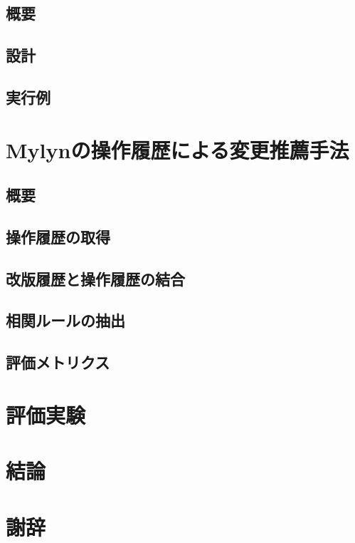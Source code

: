 \documentclass[a4paper]{jsbook}
\begin{document}
\section{概要}
\section{設計}
\section{実行例}
\chapter{Mylynの操作履歴による変更推薦手法}\label{experiment_chap}
\section{概要}
\section{操作履歴の取得}
\section{改版履歴と操作履歴の結合}
\section{相関ルールの抽出}
\section{評価メトリクス}
\chapter{評価実験}
\chapter{結論}
\chapter{謝辞}
\appendix

\backmatter


\end{document}
